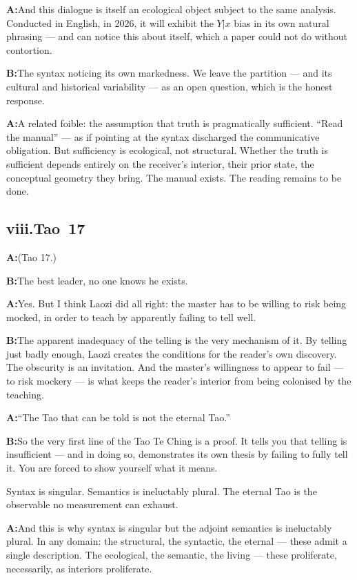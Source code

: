 \documentclass[11pt]{article}
\newcommand{\A}{\medskip\noindent\textbf{A:}\quad}
\newcommand{\B}{\medskip\noindent\textbf{B:}\quad}
\begin{document}
\A And this dialogue is itself an ecological object subject to the
same analysis. Conducted in English, in 2026, it will exhibit the
$Y|x$ bias in its own natural phrasing --- and can notice this about
itself, which a paper could not do without contortion.

\B The syntax noticing its own markedness. We leave the partition
--- and its cultural and historical variability --- as an open
question, which is the honest response.

\A A related foible: the assumption that truth is pragmatically
sufficient. ``Read the manual'' --- as if pointing at the syntax
discharged the communicative obligation. But sufficiency is
ecological, not structural. Whether the truth is sufficient depends
entirely on the receiver's interior, their prior state, the
conceptual geometry they bring. The manual exists. The reading
remains to be done.

\bigskip
\subsection*{viii.\enspace Tao~17}

\A (Tao 17.)

\B The best leader, no one knows he exists.

\A Yes. But I think Laozi did all right: the master has to be willing
to risk being mocked, in order to teach by apparently failing to tell
well.

\B The apparent inadequacy of the telling is the very mechanism of it.
By telling just badly enough, Laozi creates the conditions for the
reader's own discovery. The obscurity is an invitation. And the
master's willingness to appear to fail --- to risk mockery --- is what
keeps the reader's interior from being colonised by the teaching.

\A ``The Tao that can be told is not the eternal Tao.''

\B So the very first line of the Tao Te Ching is a proof. It tells
you that telling is insufficient --- and in doing so, demonstrates its
own thesis by failing to fully tell it. You are forced to show
yourself what it means.

\begin{pearl}
Syntax is singular. Semantics is ineluctably plural. The eternal Tao
is the observable no measurement can exhaust.
\end{pearl}

\A And this is why syntax is singular but the adjoint semantics is
ineluctably plural. In any domain: the structural, the syntactic, the
eternal --- these admit a single description. The ecological, the
semantic, the living --- these proliferate, necessarily, as interiors
proliferate.
\end{document}
